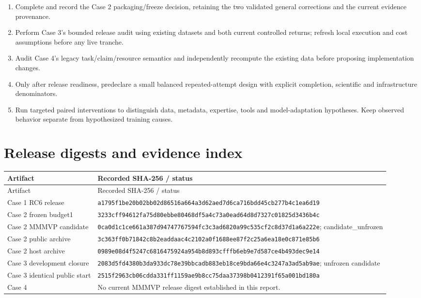 \documentclass[11pt,a4paper]{article}
\newcommand{\filepath}[1]{\nolinkurl{#1}}
\begin{document}
\begin{enumerate}
\item Complete and record the Case 2 packaging/freeze decision, retaining the two validated general corrections and the current evidence provenance.
\item Perform Case 3's bounded release audit using existing datasets and both current controlled returns; refresh local execution and cost assumptions before any live tranche.
\item Audit Case 4's legacy task/claim/resource semantics and independently recompute the existing data before proposing implementation changes.
\item Only after release readiness, predeclare a small balanced repeated-attempt design with explicit completion, scientific and infrastructure denominators.
\item Run targeted paired interventions to distinguish data, metadata, expertise, tools and model-adaptation hypotheses. Keep observed behavior separate from hypothesized training causes.
\end{enumerate}

\appendix
\section{Release digests and evidence index}\label{sec:manifest}

\small
\begin{longtable}{@{}p{}p{}@{}}
\toprule Artifact & Recorded SHA-256 / status \\\midrule\endfirsthead
\toprule Artifact & Recorded SHA-256 / status \\\midrule\endhead
Case 1 RC6 release & \filepath{a1795f1be20b02bb02d86516a664a3d62aed7d6ca716bdd45cb277b4c1ea6d19} \\
Case 2 frozen budget1 & \filepath{3233cff94612fa75d80ebbe80468df5a4c73a0ead64d8d7327c01825d3436b4c} \\
Case 2 MMMVP candidate & \filepath{0ca0d1c1ce661a387d94747767594fc3c3ad6820a99c535cf2c8d37d1a6a222e}; candidate\_unfrozen \\
Case 2 public archive & \filepath{3c363ff0b71842c8b2eaddaac4c2102a0f1688ee87f2c25a6ea18e0c871e85b6} \\
Case 2 host archive & \filepath{0989e08d4f5247c6816475924a954b8d893cfffb6eb9e7d587ce4b493dec9e14} \\
Case 3 development closure & \filepath{2083d5fd4380b3da933dc78e39bbcadb883eb18ce9bda66e4c3247a3ad5ab9ae}; unfrozen candidate \\
Case 3 identical public start & \filepath{2515f2963cb06cdda331ff1159ae9b8cc75daa37398b0412391f65a001bd180a} \\
Case 4 & No current MMMVP release digest established in this report. \\\bottomrule
\end{longtable}
\normalsize
\end{document}
